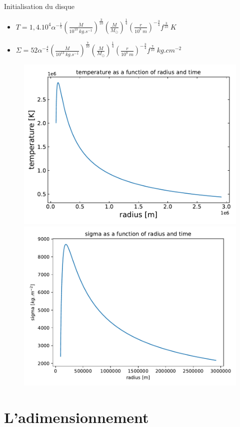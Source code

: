 \documentclass{beamer}
\begin{document}
\begin{frame}{Initialisation du disque}
    \begin{itemize}
        \item $T = 1,4.10^4 \alpha^{-\frac{1}{5}} \left(\frac{\dot{M}}{10^{13}\ kg.s^{-1}} \right)^{\frac{3}{10}} \left(\frac{M}{M_{\odot}} \right)^{\frac{1}{4}} \left(\frac{r}{10^8\ m} \right)^{-\frac{3}{4}} f^{\frac{3}{10}}\ K $
        \item $\Sigma = 52 \alpha^{-\frac{4}{5}} \left(\frac{\dot{M}}{10^{13}\ kg.s^{-1}} \right)^{\frac{7}{10}} \left(\frac{M}{M_{\odot}} \right)^{\frac{1}{4}} \left(\frac{r}{10^8\ m} \right)^{-\frac{3}{4}} f^{\frac{7}{10}}\ kg.cm^{-2}$
    \end{itemize}
    \begin{figure}
        \includegraphics[width = 0.48\linewidth]{ProfileRtemperatureInit.pdf}
        \includegraphics[width = 0.48\linewidth]{ProfileRsigmaInit.pdf}
    \end{figure}    
\end{frame}

\section{L'adimensionnement}
\end{document}
